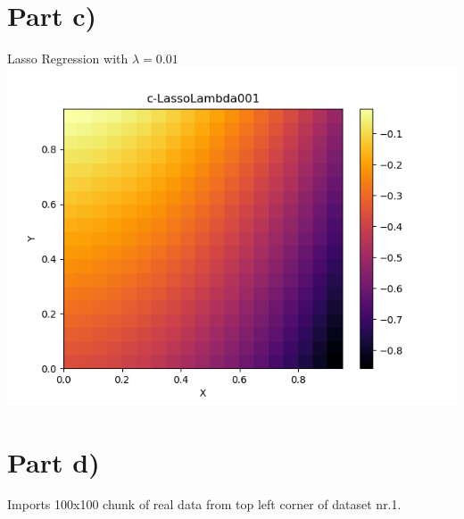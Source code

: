 \documentclass[a4paper,norsk]{article}
\begin{document}
\section*{Part c)}
Lasso Regression with $\lambda = 0.01$
\\ \includegraphics[scale=.7]{c-LassoLambda001}
\clearpage

\section*{Part d)}
Imports 100x100 chunk of real data from top left corner of dataset nr.1.
\clearpage
\end{document}
